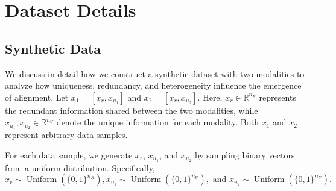 \section{Dataset Details}\label{app:dataset_details}

\subsection{Synthetic Data}\label{app:synthetic}



We discuss in detail how we construct a synthetic dataset with two modalities to analyze how uniqueness, redundancy, and heterogeneity influence the emergence of alignment. Let \(x_1 = [x_r, x_{u_1}]\) and \(x_2 = [x_r, x_{u_2}]\). Here, \(x_r \in \mathbb{R}^{n_R}\) represents the redundant information shared between the two modalities, while \(x_{u_1}, x_{u_2} \in \mathbb{R}^{n_U}\) denote the unique information for each modality. Both \(x_1\) and \(x_2\) represent arbitrary data samples.

For each data sample, we generate \(x_r\), \(x_{u_1}\), and \(x_{u_2}\) by sampling binary vectors from a uniform distribution. Specifically, \(
x_r \sim \operatorname{Uniform}(\{0, 1\}^{n_R}), x_{u_1} \sim \operatorname{Uniform}(\{0, 1\}^{n_U}), \text{ and }x_{u_2} \sim \operatorname{Uniform}(\{0, 1\}^{n_U}).
\)

